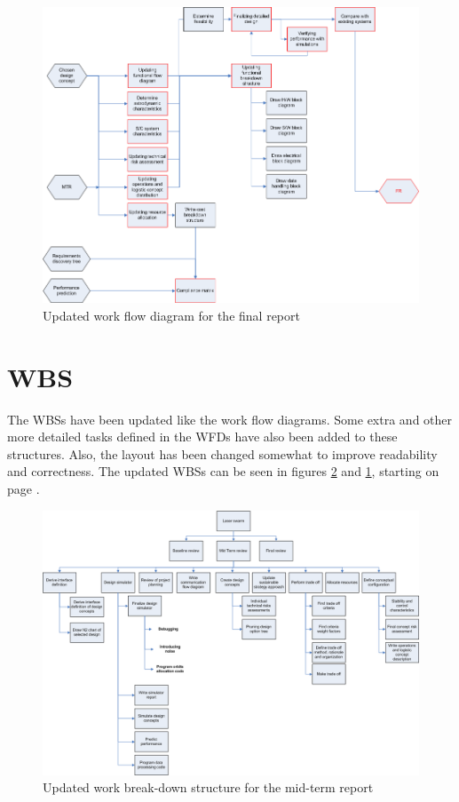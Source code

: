 \begin{figure}
\centering
\includegraphics[width=\textheight, angle=90]{chapters/img/Workflow_diagram_FR_v2.png}
\caption{Updated work flow diagram for the final report}
\label{fig:WFfinal2}
\end{figure}


\section{\acl{WBS}}
\label{WBS}
The \acp{WBS} have been updated like the work flow diagrams. Some extra and other more detailed tasks
defined in the \acp{WFD} have also been added to these structures. Also, the layout has been changed somewhat to improve readability and correctness. The updated \acp{WBS} can be seen in figures \ref{fig:WBmidterm2} and \ref{fig:WFfinal2}, starting on page \pageref{fig:WBmidterm2}.

\begin{figure}
\centering
\includegraphics[width=\textheight, angle=90]{chapters/img/Workbreakdown_structure_MTR_v2.png}
\caption{Updated work break-down structure for the mid-term report}
\label{fig:WBmidterm2}
\end{figure}

